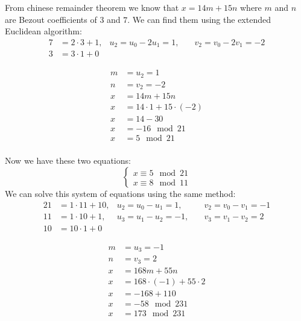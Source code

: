 \documentclass{article}
\begin{document}
From chinese remainder theorem we know that \(x = 14m + 15n\) where \(m\) and \(n\) are Bezout coefficients of \(3\) and \(7\).
We can find them using the extended Euclidean algorithm:
\begin{align*}
   7 &= 2 \cdot 3 + 1, & u_2 = u_0 - 2u_1 = 1, \quad & v_2 = v_0 - 2v_1 = -2 \\
   3 &= 3 \cdot 1 + 0
\end{align*}

\begin{align*}
   m &= u_2 = 1 \\
   n &= v_2 = -2 \\
   x &= 14m + 15n \\
   x &= 14 \cdot 1 + 15 \cdot (-2) \\
   x &= 14 - 30 \\
   x &= -16 \mod 21 \\
   x &= 5 \mod 21 \\
\end{align*}

Now we have these two equations:
\[
   \begin{cases}
      x \equiv 5 \mod 21 \\
      x \equiv 8 \mod 11
   \end{cases}
\]
We can solve this system of equations using the same method:
\begin{align*}
   21 &= 1 \cdot 11 + 10, & u_2 = u_0 - u_1 = 1, \quad & v_2 = v_0 - v_1 = -1 \\
   11 &= 1 \cdot 10 + 1, & u_3 = u_1 - u_2 = -1, \quad & v_3 = v_1 - v_2 = 2 \\
   10 &= 10 \cdot 1 + 0
\end{align*}

\begin{align*}
   m &= u_3 = -1 \\
   n &= v_3 = 2 \\
   x &= 168m + 55n \\
   x &= 168 \cdot (-1) + 55 \cdot 2 \\
   x &= -168 + 110 \\
   x &= -58 \mod 231 \\
   x &= 173 \mod 231 \\
\end{align*}
\end{document}
